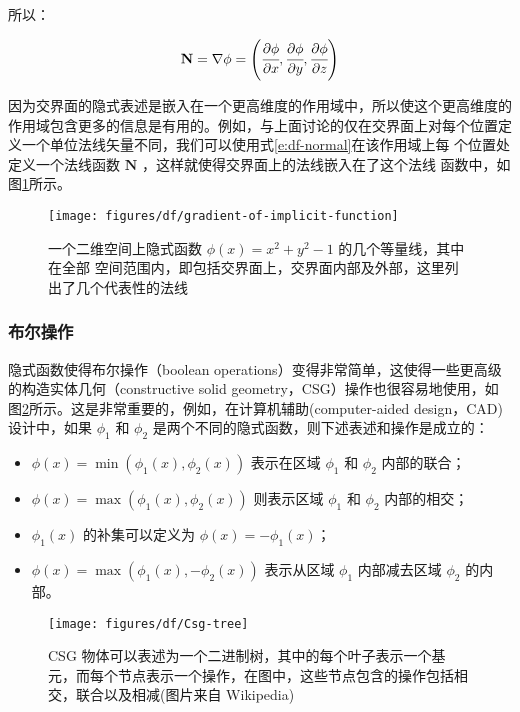 \noindent 所以：

\begin{equation}
	\mathbf{N}=\nabla\phi=\Biggl(	\cfrac{\partial\phi}{\partial x},\cfrac{\partial\phi}{\partial y},\cfrac{\partial\phi}{\partial z}\Biggl)
\end{equation}

因为交界面的隐式表述是嵌入在一个更高维度的作用域中，所以使这个更高维度的作用域包含更多的信息是有用的。例如，与上面讨论的仅在交界面上对每个位置定义一个单位法线矢量不同，我们可以使用式\ref{e:df-normal}在该作用域上每 个位置处定义一个法线函数 $\mathbf{N}$ ，这样就使得交界面上的法线嵌入在了这个法线 函数中，如图\ref{f:df-surface-normal}所示。

\begin{figure}
	\sidecaption
	\texttt{[image: figures/df/gradient-of-implicit-function]}
	\caption{一个二维空间上隐式函数 $\phi({x}) = x^{2} + y^{2} − 1$ 的几个等量线，其中在全部 空间范围内，即包括交界面上，交界面内部及外部，这里列出了几个代表性的法线}
	\label{f:df-surface-normal}
\end{figure}



\subsubsection{布尔操作}
隐式函数使得布尔操作（boolean operations）变得非常简单，这使得一些更高级的构造实体几何（constructive solid geometry，CSG）操作也很容易地使用，如图\ref{f:df-csg-tree}所示。这是非常重要的，例如，在计算机辅助(computer-aided design，CAD)设计中，如果 $\phi_1$ 和 $\phi_2$ 是两个不同的隐式函数，则下述表述和操作是成立的：

\begin{itemize}
	\item $\phi({x}) = \min(\phi_1({x}), \phi_2({x}))$ 表示在区域 $\phi_1$ 和 $\phi_2$ 内部的联合；
	\item  $\phi({x}) = \max(\phi_1({x}), \phi_2({x}))$ 则表示区域 $\phi_1$ 和 $\phi_2$ 内部的相交；
	\item $\phi_1({x})$ 的补集可以定义为 $\phi({x}) = −\phi_1({x})$；
	\item $\phi({x}) = \max(\phi_1({x}), −\phi_2({x}))$ 表示从区域 $\phi_1$ 内部减去区域 $\phi_2$ 的内部。
\end{itemize}

\begin{figure}
	\sidecaption
	\texttt{[image: figures/df/Csg-tree]}
	\caption{CSG 物体可以表述为一个二进制树，其中的每个叶子表示一个基元，而每个节点表示一个操作，在图中，这些节点包含的操作包括相交，联合以及相减(图片来自 Wikipedia)}
	\label{f:df-csg-tree}
\end{figure}

